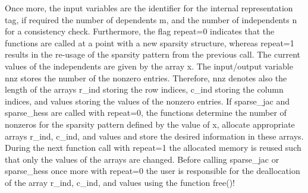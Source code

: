 \documentclass[11pt,twoside]{article}
\begin{document}
%
Once more, the input variables are the identifier for the internal
representation {\sf tag}, if required the number of dependents {\sf m},
and the number of independents {\sf n} for a consistency check. 
Furthermore, the flag {\sf repeat=0} indicates that the functions are called
at a point with a new sparsity structure, whereas  {\sf repeat=1} results in
the re-usage of the sparsity pattern from the previous call.
The current values of the independents are given by the array {\sf x}.
The input/output
variable {\sf nnz} stores the number of the nonzero entries.
Therefore, {\sf nnz} denotes also the length of the arrays {\sf r\_ind} storing
the row indices, {\sf c\_ind} storing the column indices, and
{\sf values} storing the values of the nonzero entries. 
If {\sf sparse\_jac} and {\sf sparse\_hess} are called with {\sf repeat=0},
the functions determine the number of nonzeros for the sparsity pattern 
defined by the value of {\sf x}, allocate appropriate arrays {\sf r\_ind},
{\sf c\_ind}, and {\sf values} and store the desired information in these
arrays.
During the next function call with {\sf repeat=1} the allocated memory
is reused such that only the values of the arrays are changed.   
Before calling {\sf sparse\_jac} or {\sf sparse\_hess} once more with {\sf
  repeat=0} the user is responsible for the deallocation of the array 
 {\sf r\_ind}, {\sf c\_ind}, and {\sf values} using the function {\sf
   free()}!
\end{document}
